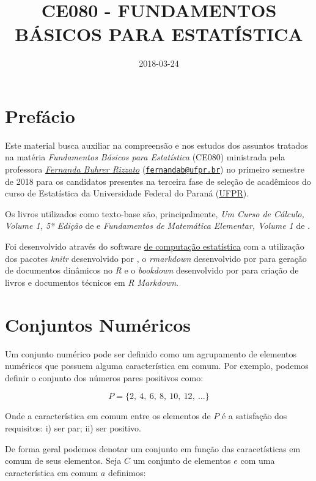 \documentclass[]{book}
\title{CE080 - FUNDAMENTOS BÁSICOS PARA ESTATÍSTICA}
\author{}
\date{2018-03-24}
\begin{document}
\maketitle

{
\setcounter{tocdepth}{1}
\tableofcontents
}
\chapter*{Prefácio}\label{prefacio}

Este material busca auxiliar na compreensão e nos estudos dos assuntos
tratados na matéria \emph{Fundamentos Básicos para Estatística} (CE080)
ministrada pela professora
\href{http://leg.ufpr.br/doku.php/pessoais:fernanda}{\emph{Fernanda
Buhrer Rizzato}}
(\href{mailto:fernandab@ufpr.br}{\nolinkurl{fernandab@ufpr.br}}) no
primeiro semestre de 2018 para os candidatos presentes na terceira fase
de seleção de acadêmicos do curso de Estatística da Universidade Federal
do Paraná (\href{http://www.ufpr.br/}{UFPR}).

Os livros utilizados como texto-base são, principalmente, \emph{Um Curso
de Cálculo, Volume 1, 5ª Edição} de \citet{guidorizzi2013curso} e
\emph{Fundamentos de Matemática Elementar, Volume 1} de
\citet{iezzi2004fundamentos}.

Foi desenvolvido através do software
\href{https://www.r-project.org/}{\citet{R-base} de computação
estatística} com a utilização dos pacotes \emph{knitr} desenvolvido por
\citet{R-knitr}, o \emph{rmarkdown} desenvolvido por \citet{R-rmarkdown}
para geração de documentos dinâmicos no \emph{R} e o \emph{bookdown}
desenvolvido por \citet{R-bookdown} para criação de livros e documentos
técnicos em \emph{R Markdown}.

\chapter{Conjuntos Numéricos}\label{conjuntos-numericos}

Um conjunto numérico pode ser definido como um agrupamento de elementos
numéricos que possuem alguma característica em comum. Por exemplo,
podemos definir o conjunto dos números pares positivos como:

\[P = \{ 2,\ 4,\ 6,\ 8,\ 10,\ 12,\ ...\}\]

Onde a característica em comum entre os elementos de \(P\) é a
satisfação dos requisitos: i) ser par; ii) ser positivo.

De forma geral podemos denotar um conjunto em função das caracetísticas
em comum de seus elementos. Seja \(C\) um conjunto de elementos \(e\)
com uma característica em comum \(a\) definimos:
\end{document}
